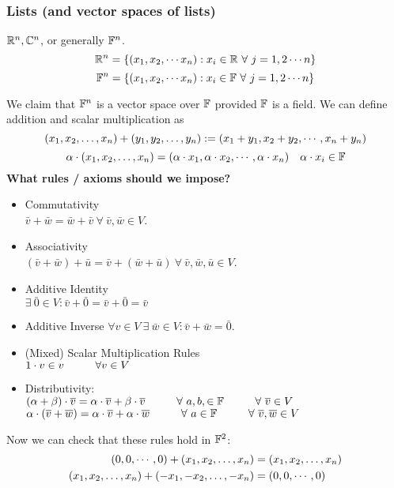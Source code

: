 \subsubsection{Lists (and vector spaces of lists)}
\begin{example} 
$\mathbb R^n, \mathbb C^n$, or generally $\mathbb F^n$. 
\[ \mathbb R^{n} = \left\{ (x_1,x_2, \cdots x_n) : x_i \in \mathbb R \ \forall \ j = 1,2 \cdots n \right\} \]
\[ \mathbb F^{n} = \left\{ (x_1,x_2, \cdots x_n) : x_i \in \mathbb F \ \forall \ j = 1,2 \cdots n \right\} \]
\end{example}
\noindent We claim that $\mathbb F^n$ is a vector space over $\mathbb F$ provided $\mathbb F$ is a field. We can define addition and scalar multiplication as 
\[ ({x}_1,{x}_2, \ldots, {x}_{n}) + ({y}_1,{y}_2, \ldots, {y}_{n}) := (x_1 + y_1, x_2 + y_2, \cdots , x_n + y_n)\]
\[ \alpha \cdot ({x}_1,{x}_2, \ldots, {x}_{n}) =  ( \alpha \cdot x_1, \alpha \cdot x_2, \cdots, \alpha \cdot x_n)\ \ \ \alpha \cdot x_i \in \mathbb F\]
\textbf{What rules / axioms should we impose?}
\begin{itemize}
    \item Commutativity \\
    $\bar v + \bar w = \bar w + \bar v \ \forall \ \bar v,\bar w \in V$. 
    \item Associativity \\
    $(\bar v + \bar w) + \bar u = \bar v + (\bar w + \bar u) \ \forall \ \bar v, \bar w, \bar u \in V$. 
    \item Additive Identity \\
    $\exists \ \bar 0 \in V : \bar v + \bar 0 = \bar v + \bar 0 = \bar v$ 
    \item Additive Inverse
    $\forall v \in V \ \exists \ \bar w \in V : \bar v + \bar w = \bar 0$.
    \item (Mixed) Scalar Multiplication Rules \\
    $1 \cdot v \in v \hspace{1cm} \forall v \in V$
    \item Distributivity:  \\
    $(\alpha + \beta ) \cdot \bar v = \alpha \cdot \bar v + \beta \cdot \bar v \tab \forall \ a,b, \in \b F \tab \forall \ \bar v \in V$ \\
    $\alpha \cdot (\bar v + \bar w) = \alpha \cdot \bar v + \alpha \cdot \bar w \tab \forall \ a \in \b F \tab \forall \ \bar v ,\bar w \in V$
\end{itemize}
Now we can check that these rules hold in $\mathbb F^2$:
\begin{align*}
    (0,0,\cdots,0) + ({x}_1,{x}_2, \ldots, {x}_{n}) &= ({x}_1,{x}_2, \ldots, {x}_{n}) \\
    ({x}_1,{x}_2, \ldots, {x}_{n}) + ({-x}_1,{-x}_2, \ldots, {-x}_{n}) &= (0,0,\cdots,0) 
\end{align*} \\
